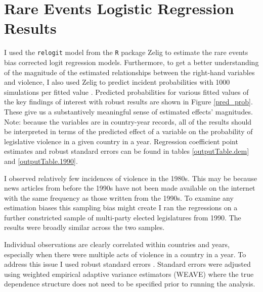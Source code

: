 \documentclass[a4paper]{article}\usepackage[]{graphicx}\usepackage[]{color}
\begin{document}


\section{Rare Events Logistic Regression Results}

I used the {\tt{relogit}} model from the {\tt{R}} package Zelig \citep{IMAIKingZelig2008} to estimate the rare events bias corrected logit regression models. Furthermore, to get a better understanding of the magnitude of the estimated relationships between the right-hand variables and violence, I also used Zelig to predict incident probabilities with 1000 simulations per fitted value \citep[see][]{King2002}. Predicted probabilities for various fitted values of the key findings of interest with robust results are shown in Figure \ref{pred_prob}. These give us a substantively meaningful sense of estimated effects' magnitudes. Note: because the variables are in country-year records, all of the results should be interpreted in terms of the predicted effect of a variable on the probability of legislative violence in a given country in a year. Regression coefficient point estimates and robust standard errors can be found in tables \ref{outputTable.dem} and \ref{outputTable.1990}.

I observed relatively few incidences of violence in the 1980s. This may be because news articles from before the 1990s have not been made available on the internet with the same frequency as those written from the 1990s. To examine any estimation biases this sampling bias might create I ran the regressions on a further constricted sample of multi-party elected legislatures from 1990. The results were broadly similar across the two samples. 

Individual observations are clearly correlated within countries and years, especially when there were multiple acts of violence in a country in a year. To address this issue I used robust standard errors \citep{Golder2006, Mainwaring2007}. Standard errors were adjusted using \cite{Lumley1999} weighted empirical adaptive variance estimators (WEAVE) where the true dependence structure does not need to be specified prior to running the analysis. 
\end{document}
